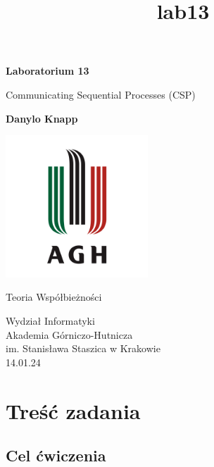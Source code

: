\documentclass[11pt]{article}
\title{lab13}
\begin{document}
    
    \begin{titlepage}
        \begin{center}
            \vspace*{1cm}
    
            \textbf{Laboratorium 13}
    
            \vspace{0.5cm}
            Communicating Sequential Processes (CSP)
                
            \vspace{1.5cm}
    
            \textbf{Danylo Knapp}

            \vfill

            \includegraphics[width=0.4\textwidth]{../report-templates/agh-logo.png}
    
            \vfill
                
            Teoria Współbieżności
                
            \vspace{0.8cm}

            Wydział Informatyki\\
            Akademia Górniczo-Hutnicza\\
            im. Stanisława Staszica w Krakowie\\
            14.01.24
                
        \end{center}
    \end{titlepage}
    
    

    
    \hypertarget{treux15bux107-zadania}{%
\section{Treść zadania}\label{treux15bux107-zadania}}

    \hypertarget{cel-ux107wiczenia}{%
\subsection{Cel ćwiczenia}\label{cel-ux107wiczenia}}
\end{document}
